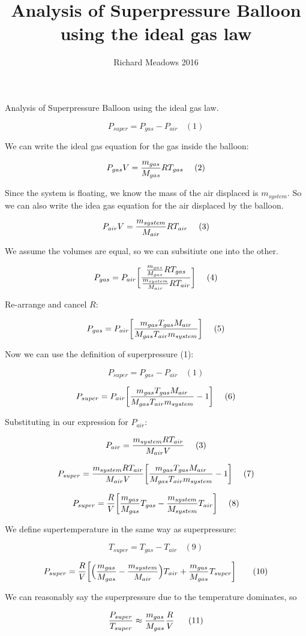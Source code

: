 \documentclass{article}
\begin{document}
\title{Analysis of Superpressure Balloon using the ideal gas law}
\author{Richard Meadows 2016}

Analysis of Superpressure Balloon using the ideal gas law.

\[
P_{super} = P_{gas} - P_{air} \ \ \ \ (1)
\]

We can write the ideal gas equation for the gas inside the balloon:

\[
 P_{gas}V = {m_{gas}\over{M_{gas}}} R T_{gas} \ \ \ \ (2)
\]

Since the system is floating, we know the mass of the air displaced is
$m_{system}$. So we can also write the idea gas equation for the air
displaced by the balloon.

\[
 P_{air}V = {m_{system}\over{M_{air}}} R T_{air} \ \ \ \ (3)
\]

We assume the volumes are equal, so we can subsitiute one into the other.

\[
 P_{gas} = P_{air} \bigg[ {{{m_{gas}\over{M_{gas}}} R T_{gas}}\over{{m_{system}\over{M_{air}}} R T_{air}}}  \bigg]  \ \ \ \ (4)
\]

Re-arrange and cancel $R$:

\[
 P_{gas} = { P_{air} \bigg[ { {m_{gas}T_{gas}M_{air}}\over{M_{gas}T_{air}m_{system}} } \bigg]}  \ \ \ \ (5)
\]

Now we can use the definition of superpressure (1):

\[
P_{super} = P_{gas} - P_{air} \ \ \ \ (1)
\]

\[
 P_{super} = { P_{air} \bigg[ { {m_{gas}T_{gas}M_{air}}\over{M_{gas}T_{air}m_{system}} } - 1\bigg]}  \ \ \ \ (6)
\]

Substituting in our expression for $P_{air}$:

\[
 P_{air} = {{m_{system}R T_{air}}\over{M_{air}V}} \ \ \ \ (3)
\]

\[
 P_{super} = { {{m_{system}R T_{air}}\over{M_{air}V}} \bigg[ { {m_{gas}T_{gas}M_{air}}\over{M_{gas}T_{air}m_{system}} } - 1\bigg]}  \ \ \ \ (7)
\]

\[
 P_{super} = { {R\over{V}} \bigg[ { {m_{gas}}\over{M_{gas}} } T_{gas} - { {m_{system}}\over{M_{system}} } T_{air}\bigg]}  \ \ \ \ (8)
\]

We define supertemperature in the same way as superpressure:

\[
 T_{super} = T_{gas} - T_{air} \ \ \ \ (9)
\]

\[
 P_{super} = { {R\over{V}} \bigg[ \Big( {m_{gas}\over{M_{gas}}} - {m_{system}\over{M_{air}}} \Big)T_{air}   +  {{m_{gas}}\over{M_{gas}}}T_{super} \bigg]} \ \ \ \ \ \ (10)
\]

We can reasonably say the superpressure due to the temperature dominates, so

\[
 {P_{super}\over{T_{super}}} \approx   {{m_{gas}}\over{M_{gas}}}{R\over{V}} \ \ \ \ \ (11)
\]
\end{document}
